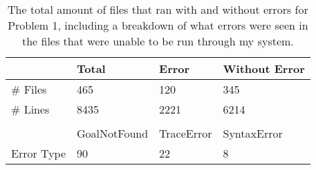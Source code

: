 \begin{table}[htbp]
\centering

\begin{tabular}{llll}
\multicolumn{1}{l|}{}           & Total        & Error      & Without Error \\ \hline
\multicolumn{1}{l|}{\# Files}   & 465          & 120        & 345           \\
\multicolumn{1}{l|}{\# Lines}   & 8435         & 2221       & 6214          \\
                                &              &            &               \\
\multicolumn{1}{l|}{}           & GoalNotFound & TraceError & SyntaxError   \\ \hline
\multicolumn{1}{l|}{Error Type} & 90           & 22         & 8            
\end{tabular}
\caption{The total amount of files that ran with and without errors for Problem 1, including a breakdown of what errors were seen in the files that were unable to be run through my system. \label{tab:p1FLB}}
\end{table}